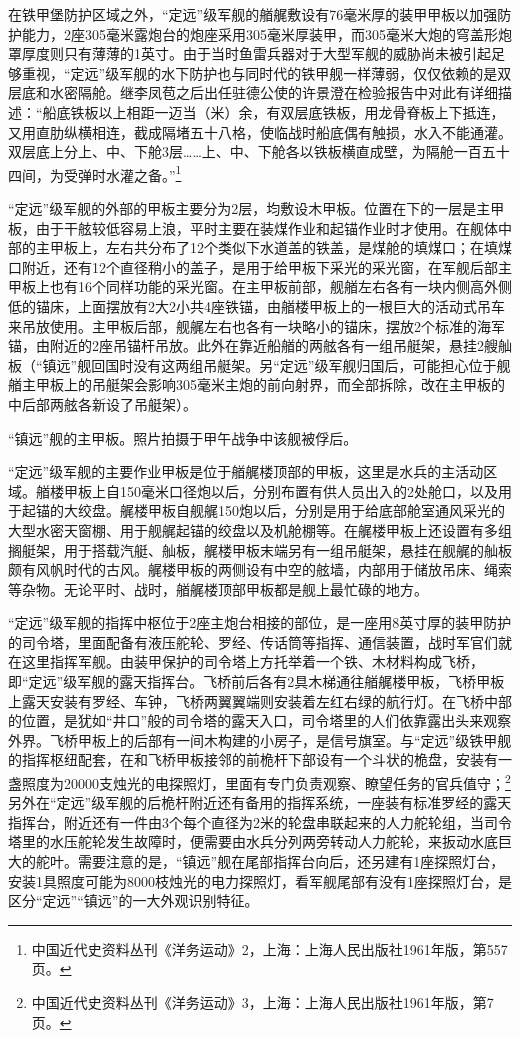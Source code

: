 \documentclass[12pt,UTF8]{ctexbook}
\begin{document}
在铁甲堡防护区域之外，“定远”级军舰的艏艉敷设有76毫米厚的装甲甲板以加强防护能力，2座305毫米露炮台的炮座采用305毫米厚装甲，而305毫米大炮的穹盖形炮罩厚度则只有薄薄的1英寸。由于当时鱼雷兵器对于大型军舰的威胁尚未被引起足够重视，“定远”级军舰的水下防护也与同时代的铁甲舰一样薄弱，仅仅依赖的是双层底和水密隔舱。继李凤苞之后出任驻德公使的许景澄在检验报告中对此有详细描述：“船底铁板以上相距一迈当（米）余，有双层底铁板，用龙骨脊板上下抵连，又用直肋纵横相连，截成隔堵五十八格，使临战时船底偶有触损，水入不能通灌。双层底上分上、中、下舱3层……上、中、下舱各以铁板横直成壁，为隔舱一百五十四间，为受弹时水灌之备。”\footnote{中国近代史资料丛刊《洋务运动》2，上海：上海人民出版社1961年版，第557页。}

“定远”级军舰的外部的甲板主要分为2层，均敷设木甲板。位置在下的一层是主甲板，由于干舷较低容易上浪，平时主要在装煤作业和起锚作业时才使用。在舰体中部的主甲板上，左右共分布了12个类似下水道盖的铁盖，是煤舱的填煤口；在填煤口附近，还有12个直径稍小的盖子，是用于给甲板下采光的采光窗，在军舰后部主甲板上也有16个同样功能的采光窗。在主甲板前部，舰艏左右各有一块内侧高外侧低的锚床，上面摆放有2大2小共4座铁锚，由艏楼甲板上的一根巨大的活动式吊车来吊放使用。主甲板后部，舰艉左右也各有一块略小的锚床，摆放2个标准的海军锚，由附近的2座吊锚杆吊放。此外在靠近船艏的两舷各有一组吊艇架，悬挂2艘舢板（“镇远”舰回国时没有这两组吊艇架。另“定远”级军舰归国后，可能担心位于舰艏主甲板上的吊艇架会影响305毫米主炮的前向射界，而全部拆除，改在主甲板的中后部两舷各新设了吊艇架）。

“镇远”舰的主甲板。照片拍摄于甲午战争中该舰被俘后。

“定远”级军舰的主要作业甲板是位于艏艉楼顶部的甲板，这里是水兵的主活动区域。艏楼甲板上自150毫米口径炮以后，分别布置有供人员出入的2处舱口，以及用于起锚的大绞盘。艉楼甲板自舰艉150炮以后，分别是用于给底部舱室通风采光的大型水密天窗棚、用于舰艉起锚的绞盘以及机舱棚等。在艉楼甲板上还设置有多组搁艇架，用于搭载汽艇、舢板，艉楼甲板末端另有一组吊艇架，悬挂在舰艉的舢板颇有风帆时代的古风。艉楼甲板的两侧设有中空的舷墙，内部用于储放吊床、绳索等杂物。无论平时、战时，艏艉楼顶部甲板都是舰上最忙碌的地方。

“定远”级军舰的指挥中枢位于2座主炮台相接的部位，是一座用8英寸厚的装甲防护的司令塔，里面配备有液压舵轮、罗经、传话筒等指挥、通信装置，战时军官们就在这里指挥军舰。由装甲保护的司令塔上方托举着一个铁、木材料构成飞桥，即“定远”级军舰的露天指挥台。飞桥前后各有2具木梯通往艏艉楼甲板，飞桥甲板上露天安装有罗经、车钟，飞桥两翼翼端则安装着左红右绿的航行灯。在飞桥中部的位置，是犹如“井口”般的司令塔的露天入口，司令塔里的人们依靠露出头来观察外界。飞桥甲板上的后部有一间木构建的小房子，是信号旗室。与“定远”级铁甲舰的指挥枢纽配套，在和飞桥甲板接邻的前桅杆下部设有一个斗状的桅盘，安装有一盏照度为20000支烛光的电探照灯，里面有专门负责观察、瞭望任务的官兵值守；\footnote{中国近代史资料丛刊《洋务运动》3，上海：上海人民出版社1961年版，第7页。}另外在“定远”级军舰的后桅杆附近还有备用的指挥系统，一座装有标准罗经的露天指挥台，附近还有一件由3个每个直径为2米的轮盘串联起来的人力舵轮组，当司令塔里的水压舵轮发生故障时，便需要由水兵分列两旁转动人力舵轮，来扳动水底巨大的舵叶。需要注意的是，“镇远”舰在尾部指挥台向后，还另建有1座探照灯台，安装1具照度可能为8000枝烛光的电力探照灯，看军舰尾部有没有1座探照灯台，是区分“定远”“镇远”的一大外观识别特征。
\end{document}
